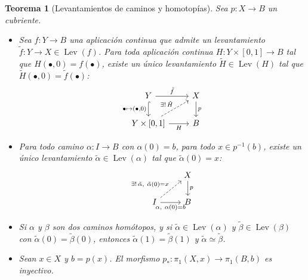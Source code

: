 \documentclass[11pt,a4paper]{article}
\theoremstyle{plain}
\newtheorem{theorem}{Teorema}[section]
\theoremstyle{definition}
\theoremstyle{remark}
\DeclareMathOperator{\Lev}{Lev}
\begin{document}
\begin{theorem}[Levantamientos de caminos y homotopías]
\label{thm:levantamiento-caminos}
Sea $p:X\to B$ un cubriente.
\begin{itemize}
\item Sea $f:Y\to B$ una aplicación continua que admite un levantamiento
$\tilde f:Y\to X\in\Lev(f)$. Para toda aplicación continua
$H:Y\times[0,1]\to B$ tal que $H(\bullet,0)=f(\bullet)$, existe un único
levantamiento $\tilde H\in\Lev(H)$ tal que $\tilde H(\bullet,0)=\tilde f(\bullet)$:
\[
\begin{tikzcd}
Y \arrow[r,"\tilde f"] \arrow[d,hook,swap,"{\bullet\mapsto(\bullet,0)}"] & X \arrow[d,"p"] \\
Y\times[0,1] \arrow[r,swap,"H"] \arrow[ur,dashed,"\exists!\,\tilde H"] & B
\end{tikzcd}
\]
\item Para todo camino $\alpha:I\to B$ con $\alpha(0)=b$, para todo
$x\in p^{-1}(b)$, existe un único levantamiento $\tilde\alpha\in\Lev(\alpha)$
tal que $\tilde\alpha(0)=x$:
\[
\begin{tikzcd}
& X \arrow[d,"p"] \\
I \arrow[ur,dashed,"{\exists!\,\tilde\alpha,\ \tilde\alpha(0)=x}"] \arrow[r,swap,"{\alpha,\ \alpha(0)=b}"] & B
\end{tikzcd}
\]
\item Si $\alpha$ y $\beta$ son dos caminos homótopos, y si
$\tilde\alpha\in\Lev(\alpha)$ y $\tilde\beta\in\Lev(\beta)$ con
$\tilde\alpha(0)=\tilde\beta(0)$, entonces $\tilde\alpha(1)=\tilde\beta(1)$
y $\tilde\alpha\simeq\tilde\beta$.
\item Sean $x\in X$ y $b=p(x)$. El morfismo $p_*:\pi_1(X,x)\to\pi_1(B,b)$
es inyectivo.
\end{itemize}
\end{theorem}
\end{document}
